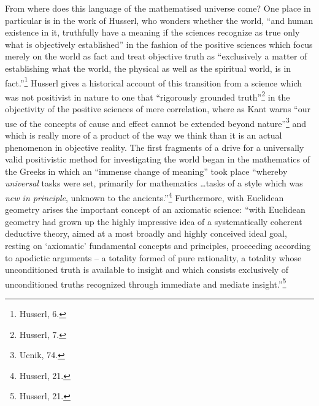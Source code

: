 \documentclass[12pt]{article}
\begin{document}
	From where does this language of the mathematised universe come? One place in particular is in the work of Husserl, who wonders whether the world, ``and human existence in it, truthfully have a meaning if the sciences recognize as true only what is objectively established'' in the fashion of the positive sciences which focus merely on the world as fact and treat objective truth as ``exclusively a matter of establishing what the world, the physical as well as the spiritual world, is in fact.''\footnote{Husserl, 6.} Husserl gives a historical account of this transition from a science which was not positivist in nature to one that ``rigorously grounded truth''\footnote{Husserl, 7.} in the objectivity of the positive sciences of mere correlation, where as Kant warns ``our use of the concepts of cause and effect cannot be extended beyond nature''\footnote{Ucnik, 74.} and which is really more of a product of the way we think than it is an actual phenomenon in objective reality. The first fragments of a drive for a universally valid positivistic method for investigating the world began in the mathematics of the Greeks in which an ``immense change of meaning'' took place ``whereby \emph{universal} tasks were set, primarily for mathematics \ldots tasks of a style which was \emph{new in principle}, unknown to the ancients.''\footnote{Husserl, 21.} Furthermore, with Euclidean geometry arises the important concept of an axiomatic science: ``with Euclidean geometry had grown up the highly impressive idea of a systematically coherent deductive theory, aimed at a most broadly and highly conceived ideal goal, resting on `axiomatic' fundamental concepts and principles, proceeding according to apodictic arguments -- a totality formed of pure rationality, a totality whose unconditioned truth is available to insight and which consists exclusively of unconditioned truths recognized through immediate and mediate insight.''\footnote{Husserl, 21.} 
\end{document}
